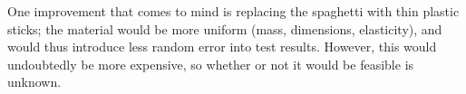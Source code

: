 \documentclass[a4paper]{article}
\begin{document}
        One improvement that comes to mind is replacing the spaghetti with thin plastic sticks; the
        material would be more uniform (mass, dimensions, elasticity), and would thus introduce less
        random error into test results. However, this would undoubtedly be more expensive, so whether
        or not it would be feasible is unknown.
\end{document}
